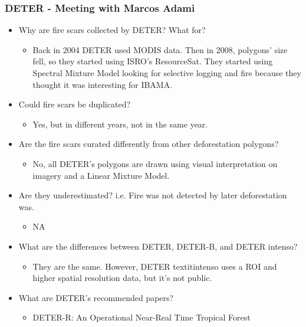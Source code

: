 \documentclass{beamer}
\begin{document}
\begin{frame}[t, allowframebreaks]
    \frametitle{DETER - Meeting with Marcos Adami}
    \begin{itemize}
        \item Why are fire scars collected by DETER? What for?
        \begin{itemize}
            \item Back in 2004 DETER used MODIS data. Then in 2008, polygons' 
                size fell, so they started using ISRO's ResourceSat. They 
                started using Spectral Mixture Model looking for selective 
                logging and fire because they thought it was interesting for
                IBAMA.
        \end{itemize}
        \item Could fire scars be duplicated? 
        \begin{itemize}
            \item Yes, but in different years, not in the same year.
        \end{itemize}
        \item Are the fire scars curated differently from other deforestation 
            polygons?
        \begin{itemize}
            \item No, all DETER's polygons are drawn using visual 
                interpretation on imagery and a Linear Mixture Model.
        \end{itemize}
        \item Are they underestimated? i.e. Fire was not detected by later 
            deforestation was.
        \begin{itemize}
            \item NA
        \end{itemize}
        \item What are the differences between DETER, DETER-B, and DETER 
            intenso?
        \begin{itemize}
            \item They are the same. However, DETER textit{intenso} uses a ROI and 
                higher spatial resolution data, but it's not public.
        \end{itemize}
        \item What are DETER's recommended papers?
        \begin{itemize}
            \item DETER-R: An Operational Near-Real Time Tropical Forest 

\end{itemize}
\end{itemize}
\end{frame}
\end{document}
